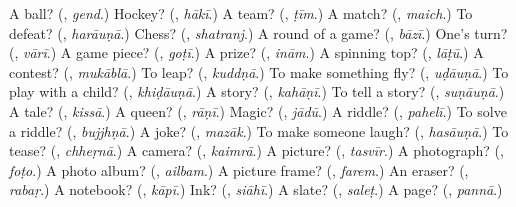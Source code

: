 \begin{tcolorbox}[breakable,colback=teal!4,colframe=teal!35!black,title={Before you move on}]
A ball? (\textbf{}, \emph{gend}.) Hockey? (\textbf{}, \emph{hākī}.) A team? (\textbf{}, \emph{ṭīm}.) A match? (\textbf{}, \emph{maich}.) To defeat? (\textbf{}, \emph{harāuṇā}.) Chess? (\textbf{}, \emph{shatranj}.) A round of a game? (\textbf{}, \emph{bāzī}.) One's turn? (\textbf{}, \emph{vārī}.) A game piece? (\textbf{}, \emph{goṭī}.) A prize? (\textbf{}, \emph{inām}.) A spinning top? (\textbf{}, \emph{lāṭū}.) A contest? (\textbf{}, \emph{mukāblā}.) To leap? (\textbf{}, \emph{kuddṇā}.) To make something fly? (\textbf{}, \emph{uḍāuṇā}.) To play with a child? (\textbf{}, \emph{khiḍāuṇā}.) A story? (\textbf{}, \emph{kahāṇī}.) To tell a story? (\textbf{}, \emph{suṇāuṇā}.) A tale? (\textbf{}, \emph{kissā}.) A queen? (\textbf{}, \emph{rāṇī}.) Magic? (\textbf{}, \emph{jādū}.) A riddle? (\textbf{}, \emph{pahelī}.) To solve a riddle? (\textbf{}, \emph{bujjhṇā}.) A joke? (\textbf{}, \emph{mazāk}.) To make someone laugh? (\textbf{}, \emph{hasāuṇā}.) To tease? (\textbf{}, \emph{chheṛnā}.) A camera? (\textbf{}, \emph{kaimrā}.) A picture? (\textbf{}, \emph{tasvīr}.) A photograph? (\textbf{}, \emph{foṭo}.) A photo album? (\textbf{}, \emph{ailbam}.) A picture frame? (\textbf{}, \emph{farem}.) An eraser? (\textbf{}, \emph{rabaṛ}.) A notebook? (\textbf{}, \emph{kāpī}.) Ink? (\textbf{}, \emph{siāhī}.) A slate? (\textbf{}, \emph{saleṭ}.) A page? (\textbf{}, \emph{pannā}.)
\end{tcolorbox}
